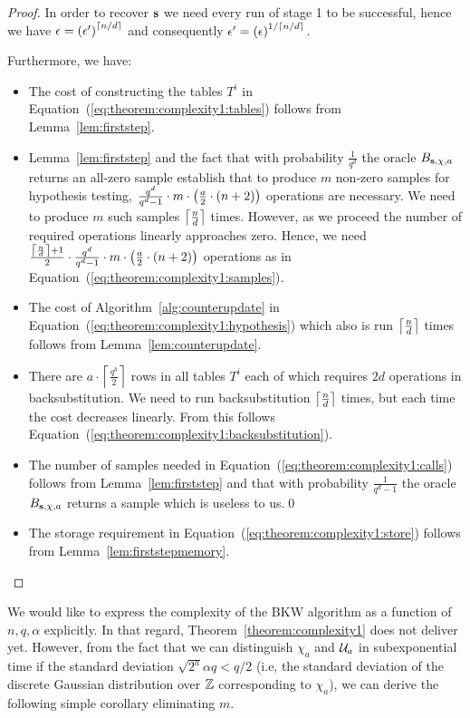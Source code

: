 \begin{proof}
In order to recover $\mathbf{s}$ we need every run of stage 1 to be successful, hence we have $\epsilon = \left(\epsilon'\right)^{\lceil n/d\rceil}$ and consequently $\epsilon' = \left(\epsilon\right)^{1/\lceil n/d\rceil}$.

Furthermore, we have:
\begin{itemize}
 \item The cost of constructing the tables $T^i$ in Equation~(\ref{eq:theorem:complexity1:tables}) follows from Lemma~\ref{lem:firststep}. 
 \item Lemma~\ref{lem:firststep} and the fact that with probability $\frac{1}{q^d}$ the oracle $B_{\mathbf{s},\chi,a}$ returns an all-zero sample establish that to produce $m$ non-zero samples for hypothesis testing, $\frac{q^d}{q^d-1} \cdot m\cdot\left(\frac{a}{2}\cdot(n+2)\right)$ operations are necessary. We need to produce $m$ such samples $\left\lceil\frac{n}{d}\right\rceil$ times. However, as we proceed the number of required operations linearly approaches zero. Hence, we need $\frac{\left\lceil\frac{n}{d}\right\rceil+1}{2} \cdot \frac{q^d}{q^d-1} \cdot m\cdot\left(\frac{a}{2}\cdot(n+2)\right)$ operations as in Equation~(\ref{eq:theorem:complexity1:samples}).
 \item The cost of Algorithm~\ref{alg:counterupdate} in Equation~(\ref{eq:theorem:complexity1:hypothesis}) which also is run $\left\lceil\frac{n}{d}\right\rceil$ times  follows from Lemma~\ref{lem:counterupdate}.
 \item There are $a \cdot \left\lceil\frac{q^b}{2}\right\rceil$ rows in all tables $T^i$ each of which requires $2d$ operations in backsubstitution. We need to run backsubstitution $\left\lceil\frac{n}{d}\right\rceil$ times, but each time the cost decreases linearly. From this follows Equation~(\ref{eq:theorem:complexity1:backsubstitution}).
 \item The number of samples needed in Equation~(\ref{eq:theorem:complexity1:calls}) follows from Lemma~\ref{lem:firststep} and that with probability $\frac{1}{q^d -1}$ the oracle $B_{\mathbf{s},\chi,a}$ returns a sample which is useless to us.\qed
 \item The storage requirement in Equation~(\ref{eq:theorem:complexity1:store}) follows from Lemma~\ref{lem:firststepmemory}.
\end{itemize}
\end{proof}

We would like to express the complexity of the BKW algorithm as a function of $n,q,\alpha$ explicitly. In that regard, Theorem~\ref{theorem:complexity1} does not deliver yet. However, from the fact that we can distinguish $\chi_a$ and $\mathcal{U}_a$ in subexponential time if the standard deviation $\sqrt{2^a}\alpha q < q/2$ (i.e, the standard deviation of the discrete Gaussian distribution over $\mathbb{Z}$ corresponding to $\chi_a$), we can derive the following simple corollary eliminating $m$.
\begin{corollary}\label{cor:complexity1}
\informaltheorem
\end{corollary}

